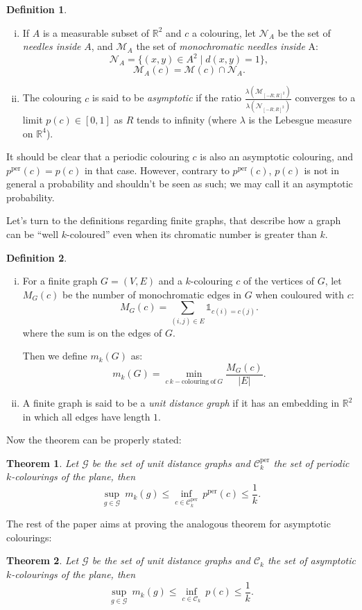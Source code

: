 \documentclass[a4paper,11pt]{article}
\newtheorem{theo}{Theorem}
\theoremstyle{definition}
\newtheorem{definition}{Definition}
\theoremstyle{remark}
\newcommand{\R}{\mathbb{R}}
\newcommand{\M}{\mathcal{M}}
\newcommand{\N}{\mathcal{N}}
\newcommand{\C}{\mathcal{C}}
\newcommand{\pper}{p^{\mathrm{per}}}
\newcommand{\Cp}{\mathcal{C}^{\mathrm{per}}}
\begin{document}
\begin{definition}
\
\begin{enumerate}[i)]\label{defas}
\item If $A$ is a measurable subset of $\R^2$ and $c$ a colouring, let $\N_A$ be
the set of \textit{needles inside} $A$, and $\M_A$ the set of \textit{monochromatic
needles inside} A:
\[\N_A = \{(x,y) \in A ^2 \mid d(x,y)=1\}, \]
\[\M_A (c) = \M (c) \cap \N_A. \]

\item  \label{asympt}The colouring $c$ is said to be \textit{asymptotic} if the ratio
$\frac{\lambda (\M_{[-R;R]^2})}{\lambda (\N_{[-R;R]^2})}$ 
converges to a limit $p(c) \in [0,1]$ as $R$ tends to infinity (where $\lambda$ 
is the Lebesgue measure on $\mathbb{R}^4$).
\end{enumerate}
\end{definition}

It should be clear that a periodic colouring $c$ is also an asymptotic colouring,
and $\pper(c)=p(c)$ in that case. However, contrary to $\pper(c)$, $p(c)$ is not
in general a probability and shouldn't be seen as such; we may call it an 
asymptotic probability.
\smallskip

Let's turn to the definitions regarding finite graphs, that describe how a graph
can be ``well $k$-coloured'' even when its chromatic number is greater
than $k$.
\begin{definition}
\ 
\begin{enumerate}[i)]
\item For a finite graph $G=(V,E)$ and a $k$-colouring $c$ of the vertices of $G$, 
let $M_G(c)$ be the number of monochromatic edges in $G$ when couloured with $c$:
$$M_G(c) = \sum_{(i, j) \in E} \mathds{1}_{c(i)=c(j)}.$$
where the sum is on the edges of $G$.

Then we define $m_k(G)$ as:
\[m_k(G) = \min_{c \ k-\mathrm{colouring \ of} \ G} \frac{M_G(c)}{|E|}.\]
\item A finite graph is said to be a \emph{unit distance graph} if it has 
an embedding in $\R^2$ in which all edges have length $1$.
\end{enumerate}
\end{definition}
Now the theorem can be properly stated:
\begin{theo} \label{ineg}
Let $\mathcal{G}$ be the set of unit distance graphs and $\Cp_k$ the set 
of periodic $k$-colourings of the plane, then
$$ \sup_{g \in \mathcal{G}} \ m_k(g) \leq \inf_{c \in \Cp_k} \ \pper(c) \leq \frac{1}{k}. $$
\end{theo}
The rest of the paper aims at proving the analogous theorem for asymptotic 
colourings:
\begin{theo} \label{ineg2}
Let $\mathcal{G}$ be the set of unit distance graphs and $\C_k$ the set 
of asymptotic $k$-colourings of the plane, then
$$ \sup_{g \in \mathcal{G}} \ m_k(g) \leq \inf_{c \in \C_k} \ p(c) \leq \frac{1}{k}. $$
\end{theo}
\end{document}
